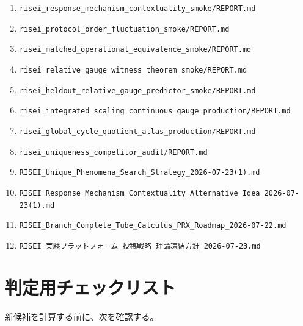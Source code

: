 \documentclass[11pt,a4paper,uplatex,dvipdfmx]{bxjsarticle}
\theoremstyle{remark}
\begin{document}
\begin{enumerate}[label={R\arabic*.}]
  \item \texttt{risei\_response\_mechanism\_contextuality\_smoke/REPORT.md}
  \item \texttt{risei\_protocol\_order\_fluctuation\_smoke/REPORT.md}
  \item \texttt{risei\_matched\_operational\_equivalence\_smoke/REPORT.md}
  \item \texttt{risei\_relative\_gauge\_witness\_theorem\_smoke/REPORT.md}
  \item \texttt{risei\_heldout\_relative\_gauge\_predictor\_smoke/REPORT.md}
  \item \texttt{risei\_integrated\_scaling\_continuous\_gauge\_production/REPORT.md}
  \item \texttt{risei\_global\_cycle\_quotient\_atlas\_production/REPORT.md}
  \item \texttt{risei\_uniqueness\_competitor\_audit/REPORT.md}
  \item \texttt{RISEI\_Unique\_Phenomena\_Search\_Strategy\_2026-07-23(1).md}
  \item \texttt{RISEI\_Response\_Mechanism\_Contextuality\_Alternative\_Idea\_2026-07-23(1).md}
  \item \texttt{RISEI\_Branch\_Complete\_Tube\_Calculus\_PRX\_Roadmap\_2026-07-22.md}
  \item \texttt{RISEI\_実験プラットフォーム\_投稿戦略\_理論凍結方針\_2026-07-23.md}
\end{enumerate}

\section{判定用チェックリスト}

新候補を計算する前に、次を確認する。
\end{document}
